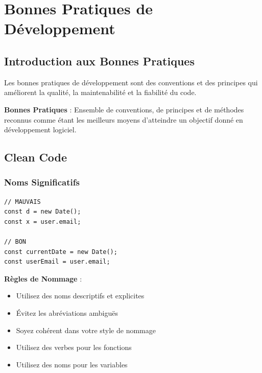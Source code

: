 \chapter{Bonnes Pratiques de Développement}

\section{Introduction aux Bonnes Pratiques}

Les bonnes pratiques de développement sont des conventions et des principes qui améliorent la qualité, la maintenabilité et la fiabilité du code.

\begin{definitionbox}
    \textbf{Bonnes Pratiques} : Ensemble de conventions, de principes et de méthodes reconnus comme étant les meilleurs moyens d'atteindre un objectif donné en développement logiciel.
\end{definitionbox}

\section{Clean Code}

\subsection{Noms Significatifs}

\begin{lstlisting}[style=javascript, caption=Mauvais vs Bon nommage]
// MAUVAIS
const d = new Date();
const x = user.email;

// BON
const currentDate = new Date();
const userEmail = user.email;
\end{lstlisting}

\begin{bestpracticebox}
    \textbf{Règles de Nommage} :
    \begin{itemize}
        \item Utilisez des noms descriptifs et explicites
        \item Évitez les abréviations ambiguës
        \item Soyez cohérent dans votre style de nommage
        \item Utilisez des verbes pour les fonctions
        \item Utilisez des noms pour les variables
    \end{itemize}
\end{bestpracticebox}

